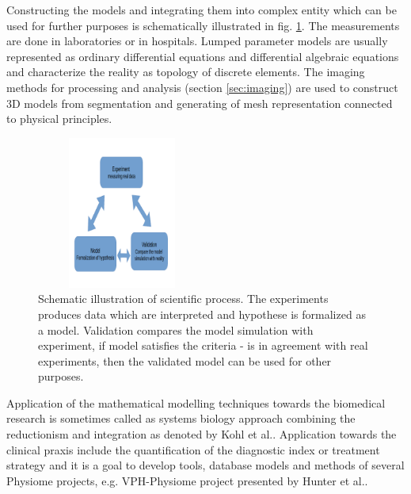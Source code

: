 Constructing the models and integrating them into complex entity which can be used for further purposes is schematically illustrated in fig. \ref{fig:modeling}. The measurements are done in laboratories or in hospitals. Lumped parameter models are usually represented as ordinary differential equations and differential algebraic equations and characterize the reality as topology of discrete elements. The imaging methods for processing and analysis (section \ref{sec:imaging}) are used to construct 3D models from segmentation and generating of mesh representation connected to physical principles. 
\begin{figure}[ht]
    \centering
    \includegraphics[width=0.5\textwidth, height=5cm]{chapter6/modeling.png}
    \caption{Schematic illustration of scientific process. The experiments produces data which are interpreted and hypothese is formalized as a model. Validation compares the model simulation with experiment, if model satisfies the criteria - is in agreement with real experiments, then the validated model can be used for other purposes.  %
    }
    \label{fig:modeling}
\end{figure}

Application of the mathematical modelling techniques towards the biomedical research is sometimes called as systems biology approach combining the reductionism and integration as denoted by Kohl et al.\cite{Kohl2010}. Application towards the clinical praxis include the quantification of the diagnostic index or treatment strategy and it is a goal to develop tools, database models and methods of several Physiome projects, e.g. VPH-Physiome project presented by Hunter et al.\cite{Hunter2009}.

